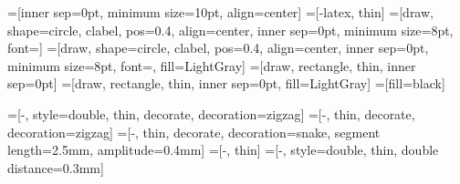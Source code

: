 =[inner sep=0pt, minimum size=10pt, align=center]
=[-latex, thin]
=[draw, shape=circle, clabel, pos=0.4, align=center, inner sep=0pt, minimum size=8pt, font=\tiny]
=[draw, shape=circle, clabel, pos=0.4, align=center, inner sep=0pt, minimum size=8pt, font=\tiny, fill=LightGray]
=[draw, rectangle, thin, inner sep=0pt]
=[draw, rectangle, thin, inner sep=0pt, fill=LightGray]
=[fill=black]

=[-, style=double, thin, decorate, decoration=zigzag]
=[-, thin, decorate, decoration=zigzag]
=[-, thin, decorate, decoration={snake, segment length=2.5mm, amplitude=0.4mm}]
=[-, thin]
=[-, style=double, thin, double distance=0.3mm]

\newcommand{\semitranscript}[5]
{
    \foreach[count=\i] \r/\t/\g in {#2}
    {
    	\node[n] (read_\i) at (0.4*\i,#3*0.4) {\r};
		\node[n] (genome_\i)  at (0.4*\i,-1) {\g};
		\ifthenelse{\equal{\t}{$ $}}
	    {
		}
		{
			\draw[e] (read_\i.south)+(0,-#3*0.4) -- (genome_\i) node[m] (transcript_\i) {\t};
		}
    }
    
    \begin{pgfonlayer}{background} 
		\draw[tape] ([xshift=0.1cm, yshift=-0.01cm]transcript_#4.north west)
				rectangle
					([xshift=-0.1cm, yshift=0.01cm]transcript_#5.south east) ;
	\end{pgfonlayer}
}

\newcommand{\transcript}[3]
{
    \semitranscript{#1}{#2}{#3}{1}{#1}
}

\newcommand{\band}[1]
{

	\draw[line] (genome_1.north west) -- (genome_#1.north east) ;
	\draw[line] (genome_1.south west) -- (genome_#1.south east) ;
	\draw[wave] (genome_1.north west) -- (genome_1.south west) ;
	\draw[wave] (genome_#1.north east) -- (genome_#1.south east) ;
}

\newcommand{\seed}[3]
{
	\ifthenelse{\equal{#3}{0}}
    {

	    \begin{pgfonlayer}{background} 
    		\draw[covered] (read_#1.north west) rectangle (read_#2.south east) ;
		\end{pgfonlayer}
    }
           
	\node[frame] (read_rect) [transform shape, fit = (read_#1) (read_#2)] {};
}

